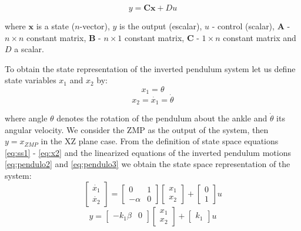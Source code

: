\begin{equation}
y = \mathbf{C}\textbf{x} + Du
\label{eq:ss2}
\end{equation}

where $\mathbf{x}$ is a state ($n$-vector), $y$ is the output (escalar), $u$ - control (scalar), $\mathbf{A}$ - $n \times n$ constant  matrix, $\mathbf{B}$ - $n \times 1$ constant matrix, $\mathbf{C}$ - $1 \times n$ constant matrix and $D$ a scalar.

To obtain the state representation of the inverted pendulum system let us define state variables $x_1$ and $x_2$ by:
\begin{equation}
x_1 = \theta
\label{eq:x1}
\end{equation}
\begin{equation}
x_2 = \dot{x_1} = \dot{\theta}
\label{eq:x2}
\end{equation} 

where angle $\theta$ denotes the rotation of the pendulum about the ankle and $\dot{\theta}$ its angular velocity. We consider the ZMP as the output of the system, then $y = x_{ZMP}$ in the XZ plane case. From the definition of state space equations \eqref{eq:ss1} - \eqref{eq:x2} and the linearized equations of the inverted pendulum motions \eqref{eq:pendulo2} and \eqref{eq:pendulo3} we obtain the state space representation of the system:
\begin{equation}
\begin{bmatrix}
\dot{x_1} \\
\dot{x_2}
\end{bmatrix} 
= 
\begin{bmatrix}
0 & 1 \\
-\alpha & 0
\end{bmatrix}
\begin{bmatrix}
x_1 \\
x_2
\end{bmatrix}
+
\begin{bmatrix}
0 \\
1
\end{bmatrix}
u
\label{eq:state_space}
\end{equation}
\begin{equation}
y = \begin{bmatrix}
-k_1\beta & 0 
\end{bmatrix}
\begin{bmatrix}
x_1 \\
x_2
\end{bmatrix}
+ \begin{bmatrix}
k_1
\end{bmatrix}
u
\label{eq:state_space_out}
\end{equation}
